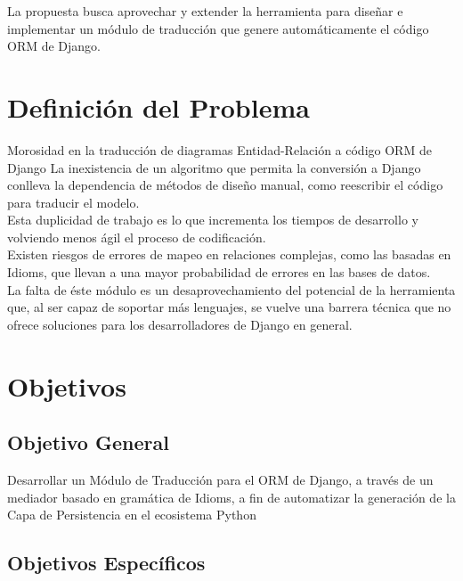 La propuesta busca aprovechar y extender la herramienta para diseñar e implementar un
módulo de traducción que genere automáticamente el código ORM de Django.

\section{Definición del Problema}
\label{sec:planteamiento-problema}
Morosidad en la traducción de diagramas Entidad-Relación a código ORM de Django
La inexistencia de un algoritmo que permita la conversión a Django conlleva la dependencia de métodos de diseño manual, como reescribir el código para traducir el modelo.\\
Esta duplicidad de trabajo es lo que  incrementa los tiempos de desarrollo y volviendo menos ágil el proceso de codificación.\\
Existen riesgos de errores de mapeo en relaciones complejas, como las basadas en Idioms, que llevan a una mayor probabilidad de errores en las bases de datos.\\
La falta de éste módulo es un desaprovechamiento del potencial de la herramienta que, al ser capaz de soportar más lenguajes, se vuelve una barrera técnica que no ofrece soluciones para los desarrolladores de Django en general.
\section{Objetivos}
\label{sec:objetivos}

\subsection{Objetivo General}
\label{subsec:objetivo-general}

Desarrollar un Módulo de Traducción para el ORM de Django, a través de un mediador basado en gramática de Idioms, a fin de automatizar la generación de la Capa de Persistencia en el ecosistema Python
\subsection{Objetivos Específicos}
\label{subsec:objetivos-especificos}

